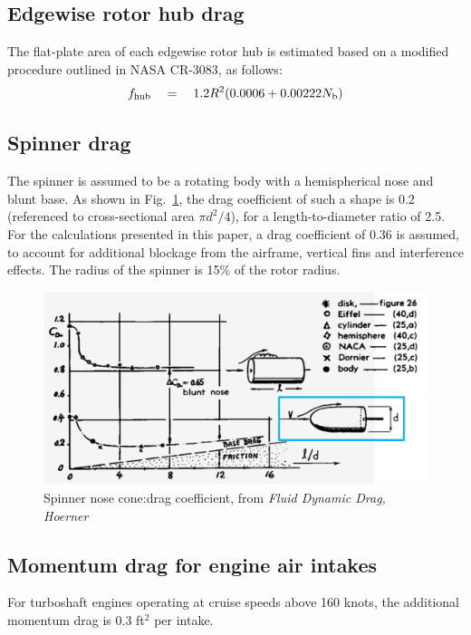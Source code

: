 \subsection{Edgewise rotor hub drag}
The flat-plate area of each edgewise rotor hub is estimated based on a modified procedure outlined in NASA CR-3083, as follows:
\begin{equation}
f_{\rm hub} \quad = \quad 1.2 R^2 (0.0006 + 0.00222 N_{\rm b})
\end{equation}

\subsection{Spinner drag}

The spinner is assumed to be a rotating body with a hemispherical nose and blunt base. As shown in Fig.~\ref{fig:fus_drag}, the drag coefficient of such a shape is 0.2 (referenced to cross-sectional area $\pi d^2/4$), for a length-to-diameter ratio of 2.5. For the calculations presented in this paper, a drag coefficient of 0.36 is assumed, to account for additional blockage from the airframe, vertical fins and interference effects. The radius of the spinner is 15\% of the rotor radius. 

\begin{figure}
\begin{center}
\includegraphics[width=\textwidth]{images/fus_drag.png}
\caption{Spinner nose cone:drag coefficient, from \emph{Fluid Dynamic Drag, Hoerner}}
\label{fig:fus_drag}
\end{center}
\end{figure}

\subsection{Momentum drag for engine air intakes}
For turboshaft engines operating at cruise speeds above 160 knots, the additional momentum drag is 0.3 ft$^2$ per intake.

